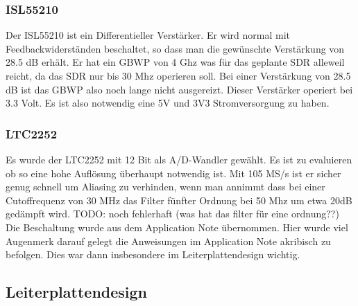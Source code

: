 \subsubsection{ISL55210}
Der ISL55210 ist ein Differentieller Verstärker. Er wird normal mit Feedbackwiderständen beschaltet, so dass man die gewünschte Verstärkung von 28.5 dB erhält.
Er hat ein GBWP von 4 Ghz was für das geplante SDR alleweil reicht, da das SDR nur bis 30 Mhz operieren soll. Bei einer Verstärkung von 28.5 dB ist das GBWP also noch lange nicht ausgereizt.
Dieser Verstärker operiert bei 3.3 Volt. Es ist also notwendig eine 5V und 3V3 Stromversorgung zu haben.

\subsubsection{LTC2252}
Es wurde der LTC2252 mit 12 Bit als A/D-Wandler gewählt. Es ist zu evaluieren ob so eine hohe Auflösung überhaupt notwendig ist.
Mit 105 MS/s ist er sicher genug schnell um Aliasing zu verhinden, wenn man annimmt dass bei einer Cutoffrequenz von 30 MHz das Filter fünfter Ordnung bei 50 Mhz um etwa 20dB gedämpft wird. TODO: noch fehlerhaft (was hat das filter für eine ordnung??)
Die Beschaltung wurde aus dem Application Note übernommen. Hier wurde viel Augenmerk darauf gelegt die Anweisungen im Application Note akribisch zu befolgen. Dies war dann insbesondere im Leiterplattendesign wichtig.

\subsection{Leiterplattendesign}